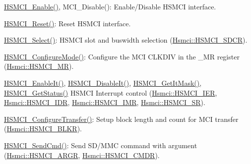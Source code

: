 \begin{DoxyEnumerate}
\item \mbox{\hyperlink{group__hsmci__functions_ga2c391b7420eb0660c30b87510a862770}{H\+S\+M\+C\+I\+\_\+\+Enable()}}, M\+C\+I\+\_\+\+Disable()\+: Enable/\+Disable H\+S\+M\+CI interface.
\item \mbox{\hyperlink{group__hsmci__functions_ga0f8d0807a99a07f6d859633b77d062b2}{H\+S\+M\+C\+I\+\_\+\+Reset()}}\+: Reset H\+S\+M\+CI interface.
\item \mbox{\hyperlink{group__hsmci__functions_ga210fc8e5e44462ef886fcccda3d2fec9}{H\+S\+M\+C\+I\+\_\+\+Select()}}\+: H\+S\+M\+CI slot and buswidth selection (\mbox{\hyperlink{structHsmci_ac694723e07a911c323c0023c63e11e56}{Hsmci\+::\+H\+S\+M\+C\+I\+\_\+\+S\+D\+CR}}).
\item \mbox{\hyperlink{group__hsmci__functions_gaf51e5a4c668bd49302fbab8329215445}{H\+S\+M\+C\+I\+\_\+\+Configure\+Mode()}}\+: Configure the M\+CI C\+L\+K\+D\+IV in the \+\_\+\+MR register (\mbox{\hyperlink{structHsmci_a49c5d303e47fb69469a4a75b1da89b8a}{Hsmci\+::\+H\+S\+M\+C\+I\+\_\+\+MR}}).
\item \mbox{\hyperlink{group__hsmci__functions_ga9b3811aee4fc3cef7fcc8b38ab0fa7f2}{H\+S\+M\+C\+I\+\_\+\+Enable\+It()}}, \mbox{\hyperlink{group__hsmci__functions_ga273099b0076489b4216672fb85d8a813}{H\+S\+M\+C\+I\+\_\+\+Disable\+It()}}, \mbox{\hyperlink{group__hsmci__functions_gae4fc955f147a6f1fa8d8c511e7f9f4f6}{H\+S\+M\+C\+I\+\_\+\+Get\+It\+Mask()}}, \mbox{\hyperlink{group__hsmci__functions_ga7395ec7b356ef056f786107518137a56}{H\+S\+M\+C\+I\+\_\+\+Get\+Status()}} H\+S\+M\+CI Interrupt control (\mbox{\hyperlink{structHsmci_a420f8706d1a668b44bd9abcfdac1af3c}{Hsmci\+::\+H\+S\+M\+C\+I\+\_\+\+I\+ER}}, \mbox{\hyperlink{structHsmci_a171d7bf8b3e27796447729f959e1b632}{Hsmci\+::\+H\+S\+M\+C\+I\+\_\+\+I\+DR}}, \mbox{\hyperlink{structHsmci_a1874b6c20ba009f1db8e43238ceb09d7}{Hsmci\+::\+H\+S\+M\+C\+I\+\_\+\+I\+MR}}, \mbox{\hyperlink{structHsmci_a0a9d96440af81fd3525d10b41b8e7013}{Hsmci\+::\+H\+S\+M\+C\+I\+\_\+\+SR}}).
\item \mbox{\hyperlink{group__hsmci__functions_gab17151fd3e0b1a81b78067b7f07b0424}{H\+S\+M\+C\+I\+\_\+\+Configure\+Transfer()}}\+: Setup block length and count for M\+CI transfer (\mbox{\hyperlink{structHsmci_ac850e75f1119ba6eef3ba7bfdd63b138}{Hsmci\+::\+H\+S\+M\+C\+I\+\_\+\+B\+L\+KR}}).
\item \mbox{\hyperlink{group__hsmci__functions_gabcc9bc86415267cdc2b54098b3dc9731}{H\+S\+M\+C\+I\+\_\+\+Send\+Cmd()}}\+: Send S\+D/\+M\+MC command with argument (\mbox{\hyperlink{structHsmci_a9b15bcf2ba54512c6d0ea6e84dfe9afb}{Hsmci\+::\+H\+S\+M\+C\+I\+\_\+\+A\+R\+GR}}, \mbox{\hyperlink{structHsmci_a249680f0d1434ba963ae4c339c878856}{Hsmci\+::\+H\+S\+M\+C\+I\+\_\+\+C\+M\+DR}}).

\end{DoxyEnumerate}
